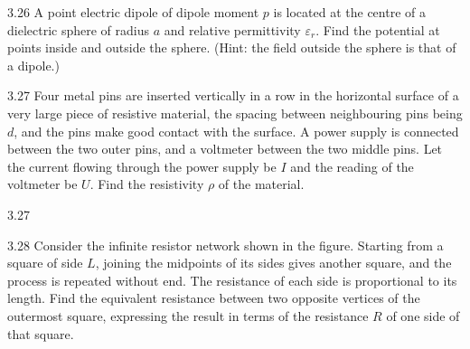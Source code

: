 \begin{problem}{3.26}
A point electric dipole of dipole moment $p$ is located at the centre of a dielectric sphere of radius $a$ and relative permittivity $\varepsilon_r$. Find the potential at points inside and outside the sphere. (Hint: the field outside the sphere is that of a dipole.)
\end{problem}

\begin{problem}{3.27}
Four metal pins are inserted vertically in a row in the horizontal surface of a very large piece of resistive material, the spacing between neighbouring pins being $d$, and the pins make good contact with the surface. A power supply is connected between the two outer pins, and a voltmeter between the two middle pins. Let the current flowing through the power supply be $I$ and the reading of the voltmeter be $U$. Find the resistivity $\rho$ of the material.
\end{problem}

\begin{figbox}{3.27}
\end{figbox}

\begin{problem}{3.28}
Consider the infinite resistor network shown in the figure. Starting from a square of side $L$, joining the midpoints of its sides gives another square, and the process is repeated without end. The resistance of each side is proportional to its length. Find the equivalent resistance between two opposite vertices of the outermost square, expressing the result in terms of the resistance $R$ of one side of that square.
\end{problem}

